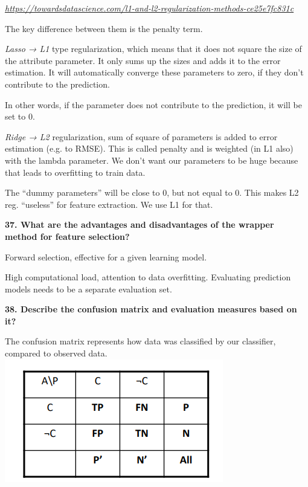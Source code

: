 \href{https://towardsdatascience.com/l1-and-l2-regularization-methods-ce25e7fc831c}{\textit{https://towardsdatascience.com/l1-and-l2-regularization-methods-ce25e7fc831c}}

The key difference between them is the penalty term.

\textit{Lasso → L1} type regularization, which means that it does not
square the size of the attribute parameter. It only sums up the sizes
and adds it to the error estimation. It will automatically converge
these parameters to zero, if they don't contribute to the prediction.

In other words, if the parameter does not contribute to the prediction,
it will be set to 0.

\textit{Ridge → L2} regularization, sum of square of parameters is
added to error estimation (e.g. to RMSE). This is called penalty and is
weighted (in L1 also) with the lambda parameter. We don't want our
parameters to be huge because that leads to overfitting to train data.

The ``dummy parameters'' will be close to 0, but not equal to 0. This
makes L2 reg. ``useless'' for feature extraction. We use L1 for that.

\textbf{37. What are the advantages and disadvantages of the wrapper
method for feature selection?}

Forward selection, effective for a given learning model.

High computational load, attention to data overfitting. Evaluating
prediction models needs to be a separate evaluation set.

\textbf{38. Describe the confusion matrix and evaluation measures based
on it?}

The confusion matrix represents how data was classified by our
classifier, compared to observed data.
\includegraphics[width=\columnwidth]{media/image17.png}

